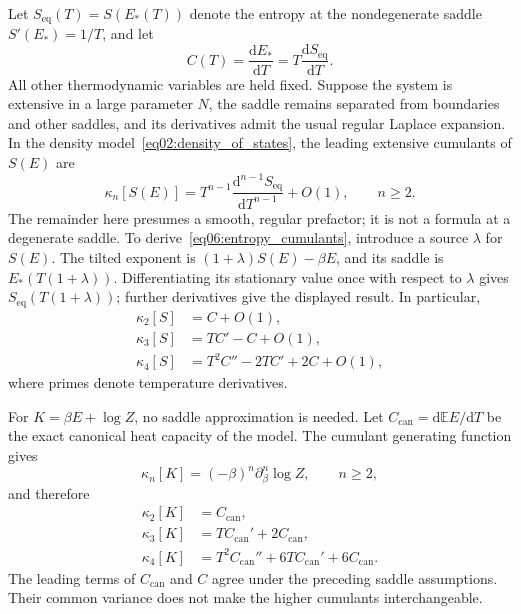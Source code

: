\documentclass[11pt,letterpaper]{article}
\newcommand{\E}{\mathbb{E}}
\newcommand{\dd}{\mathrm{d}}
\theoremstyle{plain}
\theoremstyle{definition}
\theoremstyle{remark}
\begin{document}
Let $S_{\mathrm{eq}}(T)=S(E_*(T))$ denote the entropy at the nondegenerate saddle $S'(E_*)=1/T$, and let
\begin{equation}
 C(T)=\frac{\dd E_*}{\dd T}=T\frac{\dd S_{\mathrm{eq}}}{\dd T}.
 \label{eq06:saddle_capacity}
\end{equation}
All other thermodynamic variables are held fixed. Suppose the system is extensive in a large parameter $N$, the saddle remains separated from boundaries and other saddles, and its derivatives admit the usual regular Laplace expansion. In the density model~\eqref{eq02:density_of_states}, the leading extensive cumulants of $S(E)$ are
\begin{equation}
 \kappa_n[S(E)]
 =T^{n-1}\frac{\dd^{n-1}S_{\mathrm{eq}}}{\dd T^{n-1}}+O(1),
 \qquad n\geq2.
 \label{eq06:entropy_cumulants}
\end{equation}
The remainder here presumes a smooth, regular prefactor; it is not a formula at a degenerate saddle. To derive~\eqref{eq06:entropy_cumulants}, introduce a source $\lambda$ for $S(E)$. The tilted exponent is $(1+\lambda)S(E)-\beta E$, and its saddle is $E_*(T(1+\lambda))$. Differentiating its stationary value once with respect to $\lambda$ gives $S_{\mathrm{eq}}(T(1+\lambda))$; further derivatives give the displayed result. In particular,
\begin{align}
 \kappa_2[S]&=C+O(1),\nonumber\\
 \kappa_3[S]&=TC'-C+O(1),\nonumber\\
 \kappa_4[S]&=T^2C''-2TC'+2C+O(1),
 \label{eq06:entropy_cumulants_explicit}
\end{align}
where primes denote temperature derivatives.

For $K=\beta E+\log Z$, no saddle approximation is needed. Let $C_{\mathrm{can}}=\dd\E E/\dd T$ be the exact canonical heat capacity of the model. The cumulant generating function gives
\begin{equation}
 \kappa_n[K]=(-\beta)^n\partial_\beta^n\log Z,
 \qquad n\geq2,
 \label{eq06:modular_cumulants}
\end{equation}
and therefore
\begin{align}
 \kappa_2[K]&=C_{\mathrm{can}},\nonumber\\
 \kappa_3[K]&=TC_{\mathrm{can}}'+2C_{\mathrm{can}},\nonumber\\
 \kappa_4[K]&=T^2C_{\mathrm{can}}''+6TC_{\mathrm{can}}'+6C_{\mathrm{can}}.
 \label{eq06:modular_cumulants_explicit}
\end{align}
The leading terms of $C_{\mathrm{can}}$ and $C$ agree under the preceding saddle assumptions. Their common variance does not make the higher cumulants interchangeable.
\end{document}
